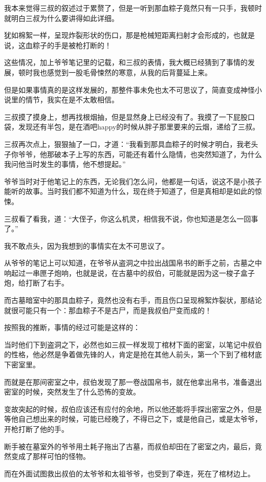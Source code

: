 我本来觉得三叔的叙述过于累赘了，但是一听到那血粽子竟然只有一只手，我顿时就明白三叔为什么要讲得如此详细。

犹如棉絮一样，呈现炸裂形状的伤口，那是枪械短距离扫射才会形成的，也就是说，这血粽子的手是被枪打断的！

这些情况，加上爷爷笔记里的记载，和三叔的表情，我大概已经猜到了事情的发展，顿时我也感觉到一股毛骨悚然的寒意，从我的后背蔓延上来。

但是如果事情真的是这样发展的，那整件事未免也太不可思议了，简直变成神怪小说里的情节，我实在是不太敢相信。

三叔摸了摸身上，想再找根烟抽，但是显然身上已经没有了。我摸了一下屁股口袋，发现还有半包，是在酒吧happy的时候从胖子那里要来的云烟，递给了三叔。

三叔再次点上，狠狠抽了一口，才道：“我看到那具血粽子的时候才明白，我老头子你爷爷，他那破本子上写的东西，可能还有着什么隐情，也突然知道了，为什么我问他当时发生的事情，他不想提起。”

爷爷当时对于他笔记上的东西，无论我们怎么问，他都是一句话，说这不是小孩子能听的故事。当时我们都不知道为什么，现在终于知道了，但是真相却是如此的惊悚。

三叔看了看我，道：“大侄子，你这么机灵，相信我不说，你也知道是怎么一回事了。”

我不敢点头，因为我想到的事情实在太不可思议了。

从爷爷的笔记上可以知道，在爷爷从盗洞之中拉出战国帛书的断手之前，古墓之中响起过一串匣子炮响，也就是说，在古墓中的叔伯，可能就是因为这一梭子盒子炮，给打断了右手。

而古墓暗室中的那具血粽子，竟然也没有右手，而且伤口呈现棉絮炸裂状，那结论就很可能只有一个：那血粽子不是古尸，而是我叔伯尸变而成的！

按照我的推断，事情的经过可能是这样的：

当时他们下到盗洞之下，必然也如三叔一样发现丁棺材下面的密室，以笔记中叔伯的性格，他必然是争着做先锋的人，肯定是抢在其他人前头，第一个下到了棺材底下密室里。

而就是在那间密室之中，叔伯发现了那一卷战国帛书，就在他拿出帛书，准备退出密室的时候，突然发生了什么恐怖的变故。

变故突起的时候，叔伯应该还有应付的余地，所以他还能将手探出密室之外，但是等他自己想出来的时候，可能已经晚了，不得已之下，或是他自己，或是太爷爷，开枪打断了他的手。

断手被在墓室外的爷爷用土耗子拖出了古墓，而叔伯却田在了密室之内，最后，竟然变成了那样可怕的怪物。

而在外面试图救出叔伯的太爷爷和太祖爷爷，也受到了牵连，死在了棺材边上。

